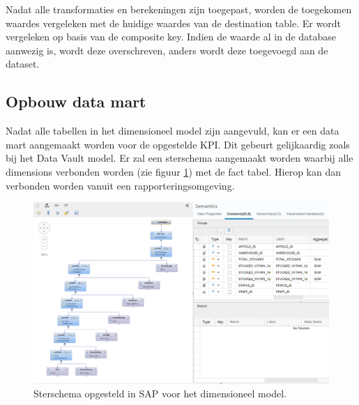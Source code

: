 Nadat alle transformaties en berekeningen zijn toegepast, worden de toegekomen waardes vergeleken met de huidige waardes van de destination table. Er wordt vergeleken op basis van de composite key. Indien de waarde al in de database aanwezig is, wordt deze overschreven, anders wordt deze toegevoegd aan de dataset.

\subsection{Opbouw data mart}
Nadat alle tabellen in het dimensioneel model zijn aangevuld, kan er een data mart aangemaakt worden voor de opgestelde KPI. Dit gebeurt gelijkaardig zoals bij het Data Vault model. Er zal een sterschema aangemaakt worden waarbij alle dimensions verbonden worden (zie figuur \ref{fig:dmdmart}) met de fact tabel. Hierop kan dan verbonden worden vanuit een rapporteringsomgeving. 

\begin{figure}[h]
	\centering
	\includegraphics[scale=0.5]{../images/DM_FG_datamart.png}
	\caption{Sterschema opgesteld in SAP voor het dimensioneel model.}
	\label{fig:dmdmart}
\end{figure}


